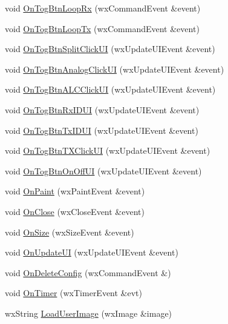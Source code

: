\begin{DoxyCompactItemize}
void \hyperlink{class_main_frame_a09d0566fff3efa1dd83d491abf69a14f}{On\-Tog\-Btn\-Loop\-Rx} (wx\-Command\-Event \&event)
\item 
void \hyperlink{class_main_frame_a13f28b66540b7e5650a0584ab0abff04}{On\-Tog\-Btn\-Loop\-Tx} (wx\-Command\-Event \&event)
\item 
void \hyperlink{class_main_frame_a16ae41128eb85673930a9f5b1eec0978}{On\-Tog\-Btn\-Split\-Click\-U\-I} (wx\-Update\-U\-I\-Event \&event)
\item 
void \hyperlink{class_main_frame_ab75fd428c1e461f06ebfc6d115dae197}{On\-Tog\-Btn\-Analog\-Click\-U\-I} (wx\-Update\-U\-I\-Event \&event)
\item 
void \hyperlink{class_main_frame_a33984a8bd48c3da22b99a8fc0a3e5b3f}{On\-Tog\-Btn\-A\-L\-C\-Click\-U\-I} (wx\-Update\-U\-I\-Event \&event)
\item 
void \hyperlink{class_main_frame_aeb39ee428bf6002fe5a44d36394a16e7}{On\-Tog\-Btn\-Rx\-I\-D\-U\-I} (wx\-Update\-U\-I\-Event \&event)
\item 
void \hyperlink{class_main_frame_a4fad443f0b49539875442afb1a55df47}{On\-Tog\-Btn\-Tx\-I\-D\-U\-I} (wx\-Update\-U\-I\-Event \&event)
\item 
void \hyperlink{class_main_frame_a45200661e219ba9533e83bd151d91de5}{On\-Tog\-Btn\-T\-X\-Click\-U\-I} (wx\-Update\-U\-I\-Event \&event)
\item 
void \hyperlink{class_main_frame_aa4daf13c845672ae664ffefb8862f4df}{On\-Tog\-Btn\-On\-Off\-U\-I} (wx\-Update\-U\-I\-Event \&event)
\item 
void \hyperlink{class_main_frame_a2977ee86cf7f80eda32e6a900d47ab81}{On\-Paint} (wx\-Paint\-Event \&event)
\item 
void \hyperlink{class_main_frame_a9f6f7f89d8b9aded1334cfa6eaca22bc}{On\-Close} (wx\-Close\-Event \&event)
\item 
void \hyperlink{class_main_frame_a8fd9580d3191784843f34269810a676b}{On\-Size} (wx\-Size\-Event \&event)
\item 
void \hyperlink{class_main_frame_a4757c5d7d0e9b2c98dc34336f1dce49e}{On\-Update\-U\-I} (wx\-Update\-U\-I\-Event \&event)
\item 
void \hyperlink{class_main_frame_aad7f15728583b9b793b695dbaec482f3}{On\-Delete\-Config} (wx\-Command\-Event \&)
\item 
void \hyperlink{class_main_frame_a9ad22e55c7a3c93f9c071d366ae760d6}{On\-Timer} (wx\-Timer\-Event \&evt)
\item 
wx\-String \hyperlink{class_main_frame_a2577b78ec0105922e5356287519d2e54}{Load\-User\-Image} (wx\-Image \&image)
\end{DoxyCompactItemize}
